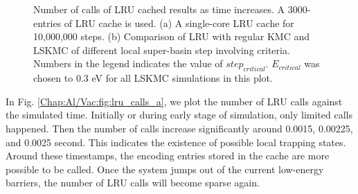 \begingroup
\begin{figure}[!ht]
  \centering
  \label{Chap:Al/Vac:fig:lru_calls_a}
  \label{Chap:Al/Vac:fig:lru_calls_b}
\caption[Number of calls of \ac{LRU} cached results as time increases.]{Number of calls of \ac{LRU} cached results as time increases. A 3000-entries of \ac{LRU} cache is used. (a) A single-core \ac{LRU} cache for 10,000,000 steps. (b) Comparison of \ac{LRU} with regular \ac{KMC} and \ac{LSKMC} of different local super-basin step involving criteria. Numbers in the legend indicates the value of $step_{critical}$. $E_{critical}$ was chosen to $0.3$ eV for all \ac{LSKMC} simulations in this plot.}
\label{Chap:Al/Vac:fig:lru_calls}
\end{figure}
\endgroup


In Fig. \ref{Chap:Al/Vac:fig:lru_calls_a}, we plot the number of \ac{LRU} calls against the simulated time. Initially or during early stage of simulation, only limited calls happened. Then the number of calls increase significantly around 0.0015, 0.00225, and 0.0025 second. This indicates the existence of possible local trapping states. Around these timestamps, the encoding entries stored in the cache are more possible to be called. Once the system jumps out of the current low-energy barriers, the number of \ac{LRU} calls will become sparse again.


